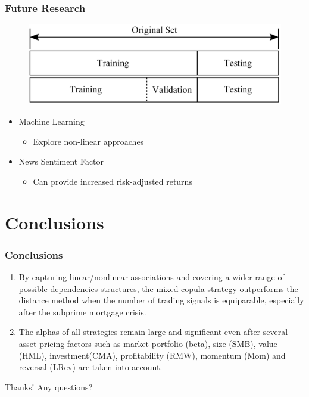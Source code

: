 \documentclass[pdf,9pt,xcolor=dvipsnames,hide notes]{beamer}
\begin{document}
\begin{frame}
\frametitle{Future Research}

	\begin{figure}[htbp]
	\centering
	\includegraphics[scale=0.14]{fig3.png}
	\label{fig:fig3}
\end{figure}

\begin{itemize}
		\item Machine Learning
	\begin{itemize}
		\item Explore non-linear approaches
	\end{itemize}
\vspace{0.3cm}
	\item News Sentiment Factor
	\begin{itemize}
		\item Can provide increased risk-adjusted returns
	\end{itemize}
	

	
\end{itemize}

\end{frame}

\section{Conclusions}

\begin{frame}[label=frame5b2]
\frametitle{Conclusions}

\begin{enumerate}
	\justifying
	

\item By capturing linear/nonlinear associations and covering a wider range of possible dependencies structures, the mixed copula strategy outperforms the distance method when the number of trading signals is equiparable, especially after the subprime mortgage crisis.

\vspace{0.3cm}

\item The alphas of all strategies remain large and significant even after several asset pricing factors such as market portfolio (beta), size (SMB), value (HML), investment(CMA), profitability (RMW), momentum (Mom) and reversal (LRev) are taken into account.

\end{enumerate}

\end{frame}

\begin{frame}
	
	\centering
	\Large{Thanks! Any questions?}
	
\end{frame}
\end{document}
